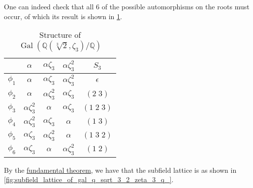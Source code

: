 \documentclass[notoc,notitlepage,nobib]{tufte-book}
\DeclareMathOperator{\Gal}{Gal}
\DeclareMathOperator{\Fix}{Fix}
\begin{document}
\begin{solution}
\begin{enumerate}
      One can indeed check that all $6$ of the possible automorphisms on the
      roots must occur, of which its result is shown in
      \cref{table:structure_of_gal_q_sqrt_3_2_zeta_3_q}.
      \begin{table}[hb]
        \centering
        \caption{Structure of $\Gal(\mathbb{Q}(\sqrt[3]{2}, \zeta_3) /
        \mathbb{Q})$}
        \label{table:structure_of_gal_q_sqrt_3_2_zeta_3_q}
        \begin{tabular}{c | c c c | c}
          & $\alpha$ & $\alpha \zeta_3$ & $\alpha \zeta_3^2$ & $S_3$ \\
          \hline
          $\phi_1$ & $\alpha$ & $\alpha \zeta_3$ & $\alpha \zeta_3^2$ & $\epsilon$ \\
          $\phi_2$ & $\alpha$ & $\alpha \zeta_3^2$ & $\alpha \zeta_3$ & $(2 \; 3)$ \\
          $\phi_3$ & $\alpha \zeta_3^2$ & $\alpha$ & $\alpha \zeta_3$ & $(1 \; 2 \; 3)$ \\
          $\phi_4$ & $\alpha \zeta_3^2$ & $\alpha \zeta_3$ & $\alpha$ & $(1 \; 3)$ \\
          $\phi_5$ & $\alpha \zeta_3$ & $\alpha \zeta_3^2$ & $\alpha$ & $(1 \; 3 \; 2)$ \\
          $\phi_6$ & $\alpha \zeta_3$ & $\alpha$ & $\alpha \zeta_3^2$ & $(1 \; 2)$
        \end{tabular}
      \end{table}

      By the \hyperref[thm:fundamental_theorem_of_galois_theory]{fundamental
      theorem}, we have that the subfield lattice is as shown in
      \cref{fig:subfield_lattice_of_gal_q_sqrt_3_2_zeta_3_q_}.
      \begin{figure*}[ht]
        \centering
        \caption{Subfield Lattice of $\Gal(\mathbb{Q}(\sqrt[3]{2}, \zeta_3) /
        \mathbb{Q})$}
        \label{fig:subfield_lattice_of_gal_q_sqrt_3_2_zeta_3_q_}
      \end{figure*}
  \end{enumerate}
\end{solution}
\end{document}

